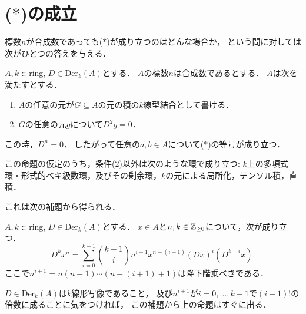 \documentclass[a4paper]{jsarticle}
\newcommand{\Der}{\mathrm{Der}}
\begin{document}
\section{($*$)の成立}
標数$n$が合成数であっても($*$)が成り立つのはどんな場合か，
という問に対しては次がひとつの答えを与える．
\begin{Prop}
    $A, k$ :: ring, $D \in \Der_k(A)$とする．
    $A$の標数$n$は合成数であるとする．
    $A$は次を満たすとする．
    \begin{enumerate}[label=(\arabic*)]
        \item $A$の任意の元が$G \subseteq A$の元の積の$k$線型結合として書ける．
        \item $G$の任意の元$g$について$D^2g=0$．
    \end{enumerate}
    この時，$D^n=0$．
    したがって任意の$a,b \in A$について($*$)の等号が成り立つ．
\end{Prop}
この命題の仮定のうち，条件(2)以外は次のような環で成り立つ:
$k$上の多項式環・形式的ベキ級数環，及びその剰余環，$k$の元による局所化，テンソル積，直積．

これは次の補題から得られる．
\begin{Lemma}
    $A, k$ :: ring, $D \in \Der_k(A)$とする．
    $x \in A$と$n,k \in \mathbb{Z}_{\geq 0}$について，次が成り立つ．
    \[ D^k x^n=\sum_{i=0}^{k-1} \binom{k-1}{i} n^{\underline{i+1}} x^{n-(i+1)} (Dx)^i (D^{k-i} x). \]
    ここで$n^{\underline{i+1}}=n(n-1)\cdots(n-(i+1)+1)$は降下階乗べきである．
\end{Lemma}
$D \in \Der_k(A)$は$k$線形写像であること，
及び$n^{\underline{i+1}}$が$i=0,\dots,k-1$で$(i+1)!$の倍数に成ることに気をつければ，
この補題から上の命題はすぐに出る．
\end{document}
